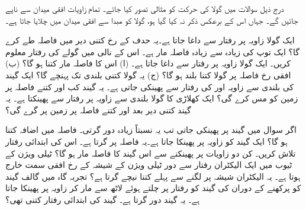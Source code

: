 درج ذیل سوالات میں گولا کی حرکت کو مثالی تصور کیا جائے۔ تمام زاویات افقی میدان سے ناپے جائیں گے۔ جہاں  اس کے برعکس ذکر نہ کیا گیا ہو، گولا کو مبدا سے افقی  میدان میں چلایا جاتا ہے۔

ایک گولا  زاویہ پر  رفتار سے داغا  جاتا ہے۔یہ حدف کے رخ کتنی دیر میں  فاصلہ طے کرے گا؟
ایک توپ  کی زیادہ سے زیادہ فاصلہ مار  ہے۔ اس کے نالی میں  گولے کی   رفتار معلوم کریں۔
ایک گولا  زاویہ پر  رفتار سے داغا  جاتا ہے۔ (ا)  اس کا فاصلہ مار کتنا ہو گا؟ (ب) افقی رخ  فاصلہ پر گولا کتنا بلند ہو گا؟ (ج)  یہ گولا کتنی بلندی تک پہنچے گا؟
ایک گیند  کی بلندی سے  زاویہ اور کی  رفتار سے پھینکی جاتی ہے۔ یہ گیند کب اور کتنے  فاصلہ پر زمین کو مس کرے گی؟ 
ایک کھلاڑی   کا گولا  بلندی سے  زاویہ پر  رفتار سے پھینکتا ہے۔ یہ گیند کتنی دیر بعد اور کتنے فاصلہ پر زمین پر گرے گی؟

اگر  سوال  میں گیند  پر پھینکی جاتی تب یہ نسبتاً زیادہ دور گرتی۔ فاصلہ میں اضافہ کتنا ہو گا؟
ایک گیند کو   زاویہ پر پھینکا جاتا ہے۔یہ  فاصلہ پر گرتا ہے۔ اس کی ابتدائی رفتار تلاش کریں۔ کن دو  زاویات  پر پھینکنے سے اس گیند کا فاصلہ مار  ہو گا؟
ٹیلی ویژن  کے ٹیوب میں  ایک الیکٹران  رفتار سے  دور    ٹیلی ویژن کے شیشہ  کے رخ   افقی سمت  خارج ہوتا ہے۔ یہ الیکٹران شیشہ پر لگنے سے پہلے کتنا نیچے گرتا ہے؟
تجربہ گاہ  میں گالف  گیند کو پرکھنے کے دوران    کی گیند کو  رفتار پر چلتے ہوئے لاٹھ سے مار کر   زاویہ پر پھینکا جاتا ہے۔ یہ گیند      دور گرتا ہے۔ گیند کی ابتدائی رفتار کتنی تھی؟  

